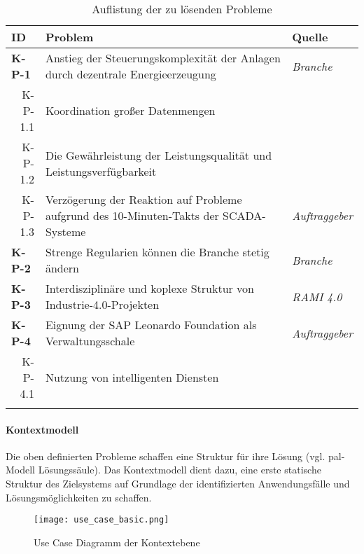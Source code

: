 \begin{table}[H]
  \begin{tabularx}{\textwidth}{@{}lXp{2cm}@{}}
      \toprule
      ID                & Problem & Quelle \\
      \midrule
      \textbf{K-P-1}              &       Anstieg der Steuerungskomplexität der Anlagen durch dezentrale Energieerzeugung               & \textit{Branche}                \\
      \multicolumn{1}{r}{K-P-1.1} &  Koordination großer Datenmengen     \\
      \multicolumn{1}{r}{K-P-1.2} &  Die Gewährleistung der Leistungsqualität und Leistungsverfügbarkeit \\
      \multicolumn{1}{r}{K-P-1.3} &  Verzögerung der Reaktion auf Probleme aufgrund des 10-Minuten-Takts der SCADA-Systeme & \textit{Auftraggeber} \\\addlinespace
      \textbf{K-P-2}              & Strenge Regularien können die Branche stetig ändern                     & \textit{Branche}                \\ \addlinespace
      \textbf{K-P-3}              & Interdisziplinäre und koplexe Struktur von Industrie-4.0-Projekten                      & \textit{RAMI 4.0}                \\
      \textbf{K-P-4}              &  Eignung der SAP Leonardo Foundation als Verwaltungsschale  & \textit{Auftraggeber} \\
      \multicolumn{1}{r}{K-P-4.1} &  Nutzung von intelligenten Diensten\\
      \addlinespace
      \bottomrule
  \end{tabularx}
  \label{kontext_probleme}
  \caption{Auflistung der zu lösenden Probleme}
\end{table}

\paragraph{Kontextmodell}

Die oben definierten Probleme schaffen eine Struktur für ihre Lösung (vgl. \ac{pal}-Modell Lösungssäule). Das Kontextmodell dient dazu, eine erste statische Struktur des Zielsystems auf Grundlage der identifizierten Anwendungsfälle und Lösungsmöglichkeiten zu schaffen.

\begin{figure}[h]
  \centering
  \texttt{[image: use\_case\_basic.png]}
  \caption[Use Case Diagramm der Kontextebene]{Use Case Diagramm der Kontextebene}
  \label{usecase_basic}
\end{figure}






